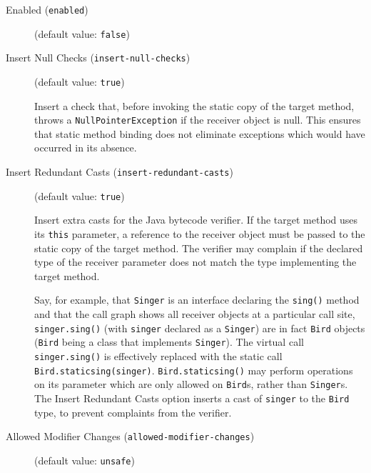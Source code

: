 \documentclass{article}
\begin{document}
\begin{description}

\item[Enabled ({\tt enabled})]
(default value: {\tt false})






\item[Insert Null Checks ({\tt insert-null-checks})]
(default value: {\tt true})




Insert a check that, before invoking the static copy of the
target method, throws a {\tt NullPointerException} if the
receiver object is null.  This ensures that static method binding does
not eliminate exceptions which would have occurred in its absence.



\item[Insert Redundant Casts ({\tt insert-redundant-casts})]
(default value: {\tt true})





\par

Insert extra casts for the Java bytecode verifier.  If the target
method uses its {\tt this} parameter, a reference to the
receiver object must be passed to the static copy of the target
method. The verifier may complain if the declared type of the
receiver parameter does not match the type implementing the
target method.

\par

Say, for example, that {\tt Singer} is an interface declaring
the {\tt sing()} method and that the call graph shows all
receiver objects at a particular call site,
{\tt singer.sing()} (with {\tt singer} declared as a
{\tt Singer}) are in fact {\tt Bird} objects ({\tt Bird}
being a class that implements {\tt Singer}). The virtual call
{\tt singer.sing()} is effectively replaced with the static
call {\tt Bird.staticsing(singer)}. {\tt Bird.staticsing()}
may perform operations on its parameter which are only allowed on
{\tt Bird}s, rather than {\tt Singer}s.  The Insert
Redundant Casts option inserts a cast of {\tt singer} to the
{\tt Bird} type, to prevent complaints from the verifier.



\item[Allowed Modifier Changes ({\tt allowed-modifier-changes})]
(default value: {\tt unsafe})





\end{description}
\end{document}
